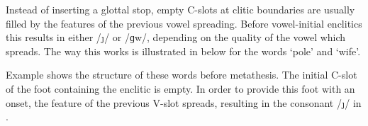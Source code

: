 Instead of inserting a glottal stop,
empty C-slots at clitic boundaries
are usually filled by the features of the previous vowel spreading.
Before vowel-initial enclitics this results in either /\j/ or /ɡw/,
depending on the quality of the vowel which spreads.
The way this works is illustrated in  below for
the words  {\ra}  `pole' and  {\ra}  `wife'.

Example  shows the structure of these words before metathesis.
The initial C-slot of the foot containing the enclitic is empty.
In order to provide this foot with an onset, the feature \tsc{[+front]} of the previous
V-slot spreads, resulting in the consonant /\j/ in .


